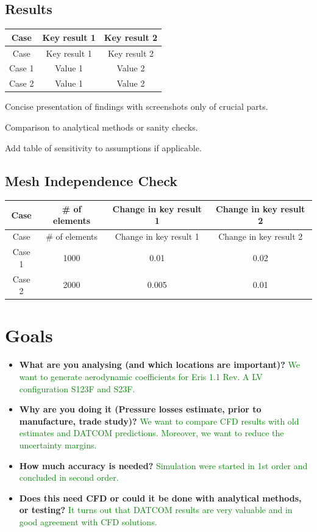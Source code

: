 \documentclass[12pt]{article}
\begin{document}
\subsection*{Results}
\begin{longtable}{|c|c|c|}
    \hline
    Case & Key result 1 & Key result 2 \\
    \hline
    \endfirsthead
    \hline
    Case & Key result 1 & Key result 2 \\
    \hline
    \endhead
    \hline
    \endfoot
    \hline
    Case 1 & Value 1 & Value 2 \\
    Case 2 & Value 1 & Value 2 \\
\end{longtable}

\noindent Concise presentation of findings with screenshots only of crucial parts.

\noindent Comparison to analytical methods or sanity checks.

\noindent Add table of sensitivity to assumptions if applicable.

\subsection*{Mesh Independence Check}
\begin{longtable}{|c|c|c|c|}
    \hline
    Case & \# of elements & Change in key result 1 & Change in key result 2 \\
    \hline
    \endfirsthead
    \hline
    Case & \# of elements & Change in key result 1 & Change in key result 2 \\
    \hline
    \endhead
    \hline
    \endfoot
    \hline
    Case 1 & 1000 & 0.01 & 0.02 \\
    Case 2 & 2000 & 0.005 & 0.01 \\
\end{longtable}

\section*{Goals}
\begin{itemize}
    \item \textbf{What are you analysing (and which locations are important)?}
    \textcolor{green}{We want to generate aerodynamic coefficients for Eris 1.1 Rev. A LV configuration S123F and S23F.}
    \item \textbf{Why are you doing it (Pressure losses estimate, prior to manufacture, trade study)?} \textcolor{green}{We want to compare CFD results with old estimates and DATCOM predictions. Moreover, we want to reduce the uncertainty margins.}
    \item \textbf{How much accuracy is needed?}
    \textcolor{green}{Simulation were started in 1st order and concluded in second order.}
    \item \textbf{Does this need CFD or could it be done with analytical methods, or testing?}
    \textcolor{green}{It turns out that DATCOM results are very valuable and in good agreement with CFD solutions.}
\end{itemize}
\end{document}
